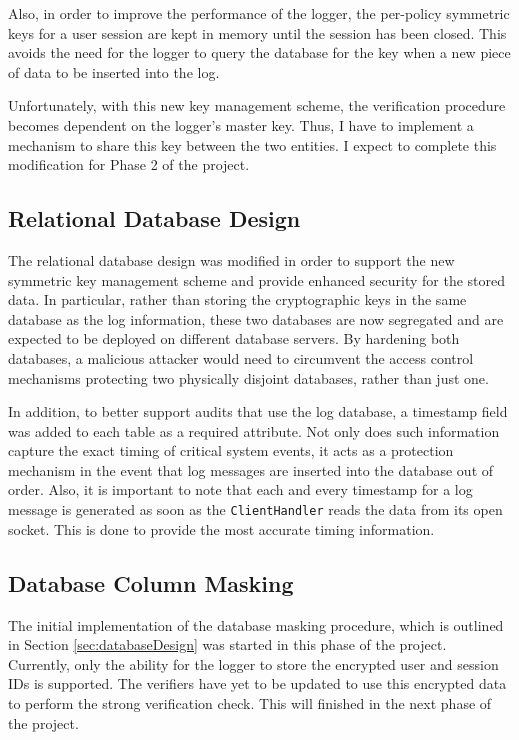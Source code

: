 \documentclass{sig-alternate}
\begin{document}
Also, in order to improve the performance of the logger, the per-policy symmetric keys for a user session are kept
in memory until the session has been closed. This avoids the need for the logger to query the database for the key 
when a new piece of data to be inserted into the log. 

Unfortunately, with this new key management scheme, the verification procedure becomes dependent on the
logger's master key. Thus, I have to implement a mechanism to share this key between the two entities. I expect
to complete this modification for Phase 2 of the project.

\subsection{Relational Database Design}
The relational database design was modified in order to support the new symmetric key management scheme and provide 
enhanced security for the stored data. In particular, rather than storing the cryptographic keys in the same database as the
log information, these two databases are now segregated and are expected to be deployed on different database servers.
By hardening both databases, a malicious attacker would need to circumvent the access control mechanisms protecting
two physically disjoint databases, rather than just one. 

In addition, to better support audits that use the log database, a timestamp field was added to each table as a required
attribute. Not only does such information capture the exact timing of critical system events, it acts as a protection
mechanism in the event that log messages are inserted into the database out of order. Also, it is important to note that
each and every timestamp for a log message is generated as soon as the {\tt ClientHandler} reads the data from
its open socket. This is done to provide the most accurate timing information.


\subsection{Database Column Masking}
The initial implementation of the database masking procedure, which is outlined in Section \ref{sec:databaseDesign}
was started in this phase of the project. Currently, only the ability for the logger to store the encrypted user and session IDs 
is supported. The verifiers have yet to be updated to use this encrypted data to perform the strong verification check. This 
will finished in the next phase of the project.
\end{document}
